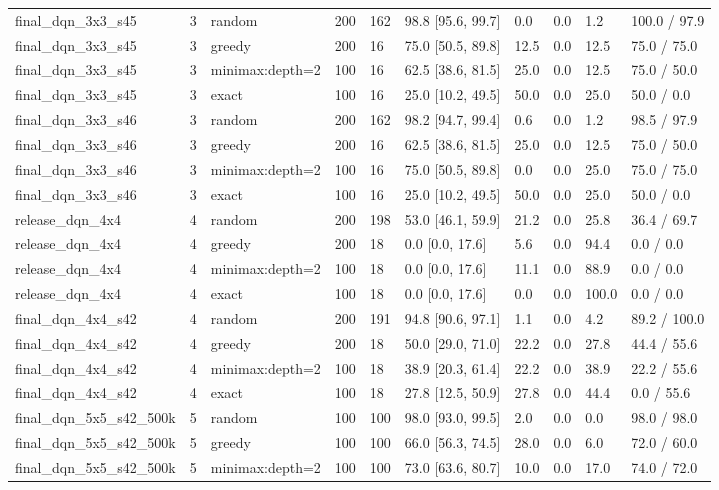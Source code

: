 \begin{table}[htbp]
\begin{tabular}{llllllllll}
final\_dqn\_3x3\_s45 & 3 & random & 200 & 162 & 98.8 [95.6, 99.7] & 0.0 & 0.0 & 1.2 & 100.0 / 97.9 \\
final\_dqn\_3x3\_s45 & 3 & greedy & 200 & 16 & 75.0 [50.5, 89.8] & 12.5 & 0.0 & 12.5 & 75.0 / 75.0 \\
final\_dqn\_3x3\_s45 & 3 & minimax:depth=2 & 100 & 16 & 62.5 [38.6, 81.5] & 25.0 & 0.0 & 12.5 & 75.0 / 50.0 \\
final\_dqn\_3x3\_s45 & 3 & exact & 100 & 16 & 25.0 [10.2, 49.5] & 50.0 & 0.0 & 25.0 & 50.0 / 0.0 \\
final\_dqn\_3x3\_s46 & 3 & random & 200 & 162 & 98.2 [94.7, 99.4] & 0.6 & 0.0 & 1.2 & 98.5 / 97.9 \\
final\_dqn\_3x3\_s46 & 3 & greedy & 200 & 16 & 62.5 [38.6, 81.5] & 25.0 & 0.0 & 12.5 & 75.0 / 50.0 \\
final\_dqn\_3x3\_s46 & 3 & minimax:depth=2 & 100 & 16 & 75.0 [50.5, 89.8] & 0.0 & 0.0 & 25.0 & 75.0 / 75.0 \\
final\_dqn\_3x3\_s46 & 3 & exact & 100 & 16 & 25.0 [10.2, 49.5] & 50.0 & 0.0 & 25.0 & 50.0 / 0.0 \\
release\_dqn\_4x4 & 4 & random & 200 & 198 & 53.0 [46.1, 59.9] & 21.2 & 0.0 & 25.8 & 36.4 / 69.7 \\
release\_dqn\_4x4 & 4 & greedy & 200 & 18 & 0.0 [0.0, 17.6] & 5.6 & 0.0 & 94.4 & 0.0 / 0.0 \\
release\_dqn\_4x4 & 4 & minimax:depth=2 & 100 & 18 & 0.0 [0.0, 17.6] & 11.1 & 0.0 & 88.9 & 0.0 / 0.0 \\
release\_dqn\_4x4 & 4 & exact & 100 & 18 & 0.0 [0.0, 17.6] & 0.0 & 0.0 & 100.0 & 0.0 / 0.0 \\
final\_dqn\_4x4\_s42 & 4 & random & 200 & 191 & 94.8 [90.6, 97.1] & 1.1 & 0.0 & 4.2 & 89.2 / 100.0 \\
final\_dqn\_4x4\_s42 & 4 & greedy & 200 & 18 & 50.0 [29.0, 71.0] & 22.2 & 0.0 & 27.8 & 44.4 / 55.6 \\
final\_dqn\_4x4\_s42 & 4 & minimax:depth=2 & 100 & 18 & 38.9 [20.3, 61.4] & 22.2 & 0.0 & 38.9 & 22.2 / 55.6 \\
final\_dqn\_4x4\_s42 & 4 & exact & 100 & 18 & 27.8 [12.5, 50.9] & 27.8 & 0.0 & 44.4 & 0.0 / 55.6 \\
final\_dqn\_5x5\_s42\_500k & 5 & random & 100 & 100 & 98.0 [93.0, 99.5] & 2.0 & 0.0 & 0.0 & 98.0 / 98.0 \\
final\_dqn\_5x5\_s42\_500k & 5 & greedy & 100 & 100 & 66.0 [56.3, 74.5] & 28.0 & 0.0 & 6.0 & 72.0 / 60.0 \\
final\_dqn\_5x5\_s42\_500k & 5 & minimax:depth=2 & 100 & 100 & 73.0 [63.6, 80.7] & 10.0 & 0.0 & 17.0 & 74.0 / 72.0 \\
\bottomrule
\end{tabular}
\end{table}
